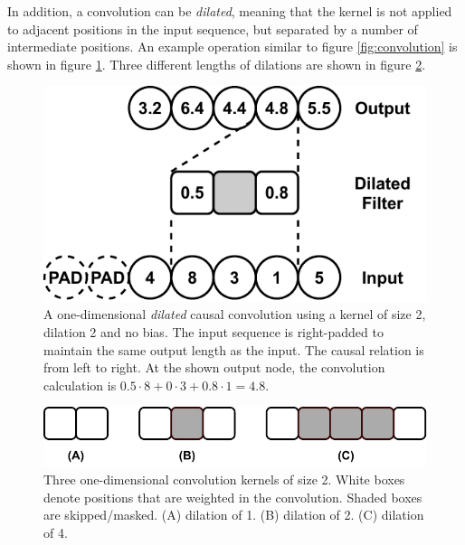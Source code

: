 In addition, a convolution can be \textit{dilated}, meaning that the kernel is not applied to adjacent positions in the input sequence, but separated by a number of intermediate positions. An example operation similar to figure \ref{fig:convolution} is shown in figure \ref{fig:dilated_convolution}. Three different lengths of dilations are shown in figure \ref{fig:filters}.

\begin{figure}[H]
    \centering
    \includegraphics{report/figures/dilated_convolution.pdf}
    \caption{A one-dimensional \textit{dilated} causal convolution using a kernel of size 2, dilation 2 and no bias. The input sequence is right-padded to maintain the same output length as the input. The causal relation is from left to right. At the shown output node, the convolution calculation is $0.5 \cdot 8 + 0 \cdot 3 + 0.8 \cdot 1 = 4.8$.}
    \label{fig:dilated_convolution}
\end{figure}

\begin{figure}[H]
    \centering
    \includegraphics{report/figures/filters.pdf}
    \caption{Three one-dimensional convolution kernels of size 2. White boxes denote positions that are weighted in the convolution. Shaded boxes are skipped/masked. (A) dilation of 1. (B) dilation of 2. (C) dilation of 4.}
    \label{fig:filters}
\end{figure}

